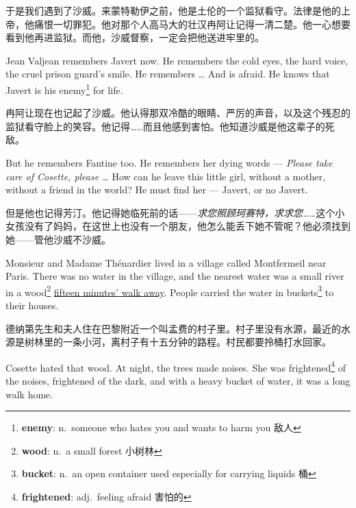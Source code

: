 \documentclass[fontset=ubuntu, zihao=5]{ctexart}
\begin{document}
\begin{paracol}{2}
  \switchcolumn

  于是我们遇到了沙威。来蒙特勒伊之前，他是土伦的一个监狱看守。法律是他的上帝，他痛恨一切罪犯。他对那个人高马大的壮汉冉阿让记得一清二楚。他一心想要看到他再进监狱。而他，沙威督察，一定会把他送进牢里的。

  \switchcolumn*

  Jean Valjean remembers Javert now. He remembers the cold eyes, the hard voice, the cruel prison guard's smile. He remembers \ldots{} And is afraid. He knows that Javert is his enemy\footnote{\textbf{enemy}: n. someone who hates you and wants to harm you 敌人}
 for life.

  \switchcolumn

  冉阿让现在也记起了沙威。他认得那双冷酷的眼睛、严厉的声音，以及这个残忍的监狱看守脸上的笑容。他记得……而且他感到害怕。他知道沙威是他这辈子的死敌。

  \switchcolumn*

  But he remembers Fantine too. He remembers her dying words --- \emph{Please take care of Cosette, please \ldots{}} How can he leave this little girl, without a mother, without a friend in the world? He must find her --- Javert, or no Javert.

  \switchcolumn

  但是他也记得芳汀。他记得她临死前的话——\emph{求您照顾珂赛特，求求您……}这个小女孩没有了妈妈，在这世上也没有一个朋友，他怎么能丢下她不管呢？他必须找到她——管他沙威不沙威。


  \switchcolumn*

  \sectionbreak

  Monsieur and Madame Thénardier lived in a village called Montfermeil near
  Paris. There was no water in the village, and the nearest water was a small
  river in a wood\footnote{\textbf{wood}: n. a small forest 小树林}
  \uline{fifteen minutes' walk away}. People carried the water in
  buckets\footnote{\textbf{bucket}: n. an open container used especially for
    carrying liquids 桶} to their houses.

  \switchcolumn

  \sectionbreak

  德纳第先生和夫人住在巴黎附近一个叫孟费的村子里。村子里没有水源，最近的水源是树林里的一条小河，离村子有十五分钟的路程。村民都要拎桶打水回家。

  \switchcolumn*

  Cosette hated that wood. At night, the trees made noises. She was frightened\footnote{\textbf{frightened}: adj. feeling afraid 害怕的}
 of the noises, frightened of the dark, and with a heavy bucket of water, it was a long walk home.


\end{paracol}
\end{document}
